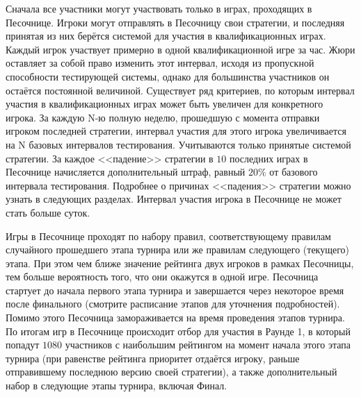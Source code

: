 Сначала все участники могут участвовать только в играх, проходящих в Песочнице. Игроки могут отправлять в Песочницу свои стратегии, и
последняя принятая из них берётся системой для участия в квалификационных играх. Каждый игрок участвует примерно в одной квалификационной
игре за час. Жюри оставляет за собой право изменить этот интервал, исходя из пропускной способности тестирующей системы, однако для
большинства участников он остаётся постоянной величиной. Существует ряд критериев, по которым интервал участия в квалификационных играх
может быть увеличен для конкретного игрока. За каждую N-ю полную неделю, прошедшую с момента отправки игроком последней стратегии, интервал
участия для этого игрока увеличивается на N базовых интервалов тестирования. Учитываются только принятые системой стратегии. За каждое
<<падение>> стратегии в $10$ последних играх в Песочнице начисляется дополнительный штраф, равный $20\%$ от базового интервала тестирования.
Подробнее о причинах <<падения>> стратегии можно узнать в следующих разделах. Интервал участия игрока в Песочнице не может стать больше
суток.

Игры в Песочнице проходят по набору правил, соответствующему правилам случайного прошедшего этапа турнира или же правилам следующего
(текущего) этапа. При этом чем ближе значение рейтинга двух игроков в рамках Песочницы, тем больше вероятность того, что они окажутся в
одной игре. Песочница стартует до начала первого этапа турнира и завершается через некоторое время после финального (смотрите расписание
этапов для уточнения подробностей). Помимо этого Песочница замораживается на время проведения этапов турнира. По итогам игр в Песочнице
происходит отбор для участия в Раунде 1, в который попадут $1080$ участников с наибольшим рейтингом на момент начала этого этапа турнира
(при равенстве рейтинга приоритет отдаётся игроку, раньше отправившему последнюю версию своей стратегии), а также дополнительный набор в
следующие этапы турнира, включая Финал.

